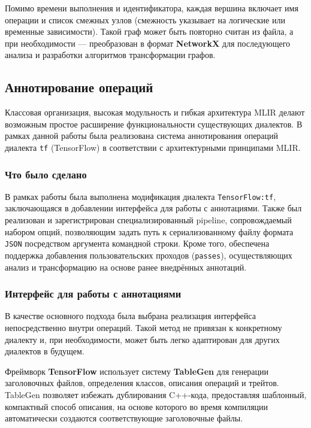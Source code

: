 Помимо времени выполнения и идентификатора, каждая вершина включает имя операции и список смежных узлов (смежность указывает на логические или временные зависимости).
Такой граф может быть повторно считан из файла, а при необходимости — преобразован в формат \textbf{NetworkX} для последующего анализа и разработки алгоритмов трансформации графов.

\subsection{Аннотирование операций}

Классовая организация, высокая модульность и гибкая архитектура MLIR делают возможным простое расширение функциональности существующих диалектов.
В рамках данной работы была реализована система аннотирования операций диалекта \texttt{tf} (TensorFlow) в соответствии с архитектурными принципами MLIR.

\subsubsection{Что было сделано}

В рамках работы была выполнена модификация диалекта \texttt{TensorFlow:tf}, заключающаяся в добавлении интерфейса для работы с аннотациями.
Также был реализован и зарегистрирован специализированный pipeline, сопровождаемый набором опций, позволяющим задать путь к сериализованному файлу формата \texttt{JSON} посредством аргумента командной строки.
Кроме того, обеспечена поддержка добавления пользовательских проходов (\texttt{passes}), осуществляющих анализ и трансформацию на основе ранее внедрённых аннотаций.

\subsubsection{Интерфейс для работы с аннотациями}

В качестве основного подхода была выбрана реализация интерфейса непосредственно внутри операций. Такой метод не привязан к конкретному диалекту и, при необходимости, может быть легко адаптирован для других диалектов в будущем.

Фреймворк \textbf{TensorFlow} использует систему \textbf{TableGen} для генерации заголовочных файлов, определения классов, описания операций и трейтов. TableGen позволяет избежать дублирования C++-кода, предоставляя шаблонный, компактный способ описания, на основе которого во время компиляции автоматически создаются соответствующие заголовочные файлы.

